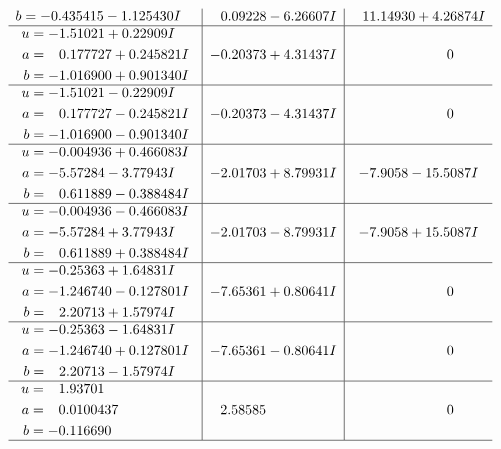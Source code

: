 \documentclass[1p]{elsarticle_modified}
\theoremstyle{definition}
\begin{document}
$$\begin{array}{c|c|c}
\begin{aligned}
b &= -0.435415 - 1.125430 I\end{aligned}
 & \phantom{-}0.09228 - 6.26607 I & \phantom{-}11.14930 + 4.26874 I \\ \hline\begin{aligned}
u &= -1.51021 + 0.22909 I \\
a &= \phantom{-}0.177727 + 0.245821 I \\
b &= -1.016900 + 0.901340 I\end{aligned}
 & -0.20373 + 4.31437 I & \phantom{-0.000000 } 0 \\ \hline\begin{aligned}
u &= -1.51021 - 0.22909 I \\
a &= \phantom{-}0.177727 - 0.245821 I \\
b &= -1.016900 - 0.901340 I\end{aligned}
 & -0.20373 - 4.31437 I & \phantom{-0.000000 } 0 \\ \hline\begin{aligned}
u &= -0.004936 + 0.466083 I \\
a &= -5.57284 - 3.77943 I \\
b &= \phantom{-}0.611889 - 0.388484 I\end{aligned}
 & -2.01703 + 8.79931 I & -7.9058 - 15.5087 I \\ \hline\begin{aligned}
u &= -0.004936 - 0.466083 I \\
a &= -5.57284 + 3.77943 I \\
b &= \phantom{-}0.611889 + 0.388484 I\end{aligned}
 & -2.01703 - 8.79931 I & -7.9058 + 15.5087 I \\ \hline\begin{aligned}
u &= -0.25363 + 1.64831 I \\
a &= -1.246740 - 0.127801 I \\
b &= \phantom{-}2.20713 + 1.57974 I\end{aligned}
 & -7.65361 + 0.80641 I & \phantom{-0.000000 } 0 \\ \hline\begin{aligned}
u &= -0.25363 - 1.64831 I \\
a &= -1.246740 + 0.127801 I \\
b &= \phantom{-}2.20713 - 1.57974 I\end{aligned}
 & -7.65361 - 0.80641 I & \phantom{-0.000000 } 0 \\ \hline\begin{aligned}
u &= \phantom{-}1.93701\phantom{ +0.000000I} \\
a &= \phantom{-}0.0100437\phantom{ +0.000000I} \\
b &= -0.116690\phantom{ +0.000000I}\end{aligned}
 & \phantom{-}2.58585\phantom{ +0.000000I} & \phantom{-0.000000 } 0\\
 \hline 
 \end{array}$$\newpage
\end{document}
